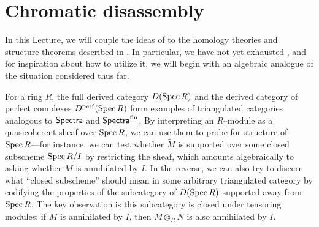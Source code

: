 








\section{Chromatic disassembly}\label{ChromaticLocalizationSection}

In this Lecture, we will couple the ideas of  to the homology theories and structure theorems described in .  In particular, we have not yet exhausted , and for inspiration about how to utilize it, we will begin with an algebraic analogue of the situation considered thus far.

For a ring $R$, the full derived category $D(\operatorname{Spec} R)$ and the derived category of perfect complexes $D^{\mathrm{perf}}(\operatorname{Spec} R)$ form examples of triangulated categories analogous to $\mathsf{Spectra}$ and $\mathsf{Spectra}^{\mathrm{fin}}$.  By interpreting an $R$--module as a quasicoherent sheaf over $\operatorname{Spec} R$, we can use them to probe for structure of $\operatorname{Spec} R$---for instance, we can test whether $\widetilde M$ is supported over some closed subscheme $\operatorname{Spec} R/I$ by restricting the sheaf, which amounts algebraically to asking whether $M$ is annihilated by $I$.  In the reverse, we can also try to discern what ``closed subscheme'' should mean in some arbitrary triangulated category by codifying the properties of the subcategory of $D(\operatorname{Spec} R)$ supported away from $\operatorname{Spec} R$.  The key observation is this subcategory is closed under tensoring modules: if $M$ is annihilated by $I$, then $M \otimes_R N$ is also annihilated by $I$.

